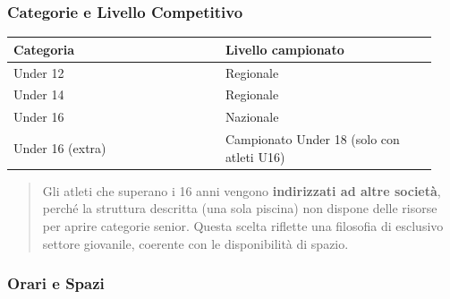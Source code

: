 \documentclass[a4paper,11pt]{article}
\begin{document}
\subsubsection{Categorie e Livello
      Competitivo}\label{categorie-e-livello-competitivo}

\begin{longtable}[]{@{}p{0.47\linewidth}p{0.47\linewidth}@{}}
      \toprule\noalign{}
      Categoria        & Livello campionato                        \\
      \midrule\noalign{}
      \endhead
      \bottomrule\noalign{}
      \endlastfoot
      Under 12         & Regionale                                 \\
      Under 14         & Regionale                                 \\
      Under 16         & Nazionale                                 \\
      Under 16 (extra) & Campionato Under 18 (solo con atleti U16) \\
\end{longtable}

\begin{quote}
      Gli atleti che superano i 16 anni vengono \textbf{indirizzati ad altre
            società}, perché la struttura descritta (una sola piscina) non dispone
      delle risorse per aprire categorie senior. Questa scelta riflette una
      filosofia di esclusivo settore giovanile, coerente con le disponibilità
      di spazio.
\end{quote}

\subsubsection{Orari e Spazi}\label{orari-e-spazi}
\end{document}
